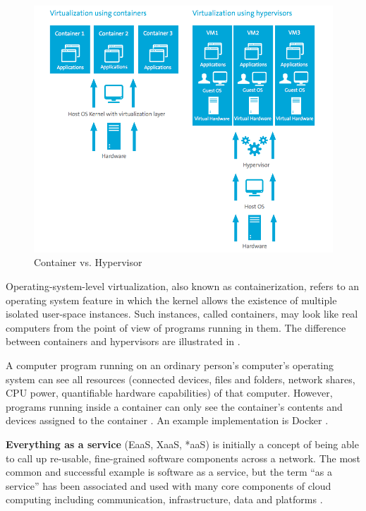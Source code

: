 \begin{figure}[ht]
  \includegraphics[width=\textwidth]{Figures/background/container_vs_hypervisor.png}
  \caption{Container vs. Hypervisor}
  \label{fig:Container_vs_Hypervisor}
\end{figure}
Operating-system-level virtualization, also known as containerization, refers to an operating system feature in which the kernel allows the existence of multiple isolated user-space instances. Such instances, called containers, may look like real computers from the point of view of programs running in them. The difference between containers and hypervisors are illustrated in .

A computer program running on an ordinary person's computer's operating system can see all resources (connected devices, files and folders, network shares, CPU power, quantifiable hardware capabilities) of that computer. However, programs running inside a container can only see the container's contents and devices assigned to the container \cite{containerization}.
An example implementation is Docker \cite{docker}.

\textbf{Everything as a service} (EaaS, XaaS, *aaS) is initially a concept of being able to call up re-usable, fine-grained software components across a network. The most common and successful example is software as a service, but the term \enquote{as a service} has been associated and used with many core components of cloud computing including communication, infrastructure, data and platforms \cite{XaaS}.

